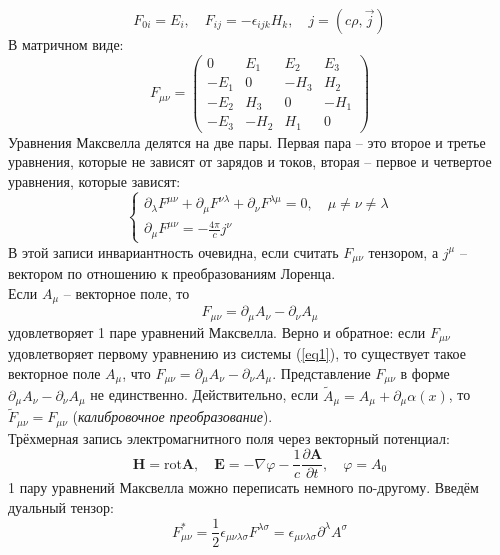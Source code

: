 \documentclass[12pt]{article}
\theoremstyle{definition}
\begin{document}
\begin{equation}
    F_{0i}=E_i,\quad F_{ij}=-\epsilon_{ijk}H_k,\quad j=(c\rho,\Vec{j})
\end{equation}
В матричном виде:
\begin{equation}
    F_{\mu\nu}=\begin{pmatrix}
    0 & E_1 & E_2 & E_3\\
    -E_1 & 0 & -H_3 & H_2\\
    -E_2 & H_3 & 0 & -H_1\\
    -E_3 & -H_2 & H_1 & 0
    \end{pmatrix}
\end{equation}
Уравнения Максвелла делятся на две пары. Первая пара -- это второе и третье уравнения, которые не зависят от зарядов и токов, вторая -- первое и четвертое уравнения, которые зависят:
\begin{equation}\label{eq1}
    \begin{cases}
        \partial_\lambda F^{\mu\nu}+\partial_\mu F^{\nu\lambda}+\partial_\nu F^{\lambda\mu}=0,\quad\mu\neq\nu\neq\lambda\\
        \partial_\mu F^{\mu\nu}=-\frac{4\pi}{c}j^\nu
    \end{cases}
\end{equation}
В этой записи инвариантность очевидна, если считать $F_{\mu\nu}$ тензором, а $j^\mu$ -- вектором по отношению к преобразованиям Лоренца.\\
Если $A_\mu$ -- векторное поле, то
\begin{equation}
    F_{\mu\nu}=\partial_\mu A_\nu-\partial_\nu A_\mu
\end{equation}
удовлетворяет 1 паре уравнений Максвелла. Верно и обратное: если $F_{\mu\nu}$ удовлетворяет первому уравнению из системы (\ref{eq1}), то существует такое векторное поле $A_\mu$, что $F_{\mu\nu} = \partial_\mu A_\nu-\partial_\nu A_\mu$. Представление $F_{\mu\nu}$ в форме $\partial_\mu A_\nu-\partial_\nu A_\mu$ не единственно. Действительно, если $\tilde{A}_\mu = A_\mu + \partial_\mu\alpha(x)$, то $\tilde{F}_{\mu\nu} = F_{\mu\nu}$ (\textit{калибровочное преобразование}).\\
Трёхмерная запись электромагнитного поля через векторный потенциал:
\begin{equation}
    \bm{H}=\text{rot}\bm{A},\quad\bm{E}=-\nabla\varphi-\frac{1}{c}\frac{\partial\bm{A}}{\partial t},\quad\varphi=A_0
\end{equation}
1 пару уравнений Максвелла можно переписать немного по-другому. Введём дуальный тензор:
\begin{equation}
    F^*_{\mu\nu}=\frac{1}{2}\epsilon_{\mu\nu\lambda\sigma}F^{\lambda\sigma}=\epsilon_{\mu\nu\lambda\sigma}\partial^\lambda A^\sigma
\end{equation}
\end{document}
